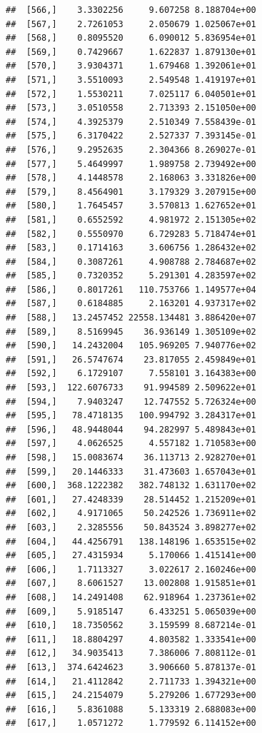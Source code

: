 \documentclass[article]{jss}\usepackage[]{graphicx}\usepackage[]{xcolor}
\makeatletter
\newenvironment{kframe}{%
 \def\at@end@of@kframe{}%
 \ifinner\ifhmode%
  \def\at@end@of@kframe{\end{minipage}}%
  \begin{minipage}{\columnwidth}%
 \fi\fi%
 \def\FrameCommand##1{\hskip\@totalleftmargin \hskip-\fboxsep
 \colorbox{shadecolor}{##1}\hskip-\fboxsep
     \hskip-\linewidth \hskip-\@totalleftmargin \hskip\columnwidth}%
 \MakeFramed {\advance\hsize-\width
   \@totalleftmargin\z@ \linewidth\hsize
   \@setminipage}}%
 {\par\unskip\endMakeFramed%
 \at@end@of@kframe}
\newenvironment{knitrout}{}{} %
\makeatother
\begin{document}
\begin{knitrout}
\begin{kframe}
\begin{verbatim}
##  [566,]    3.3302256     9.607258 8.188704e+00
##  [567,]    2.7261053     2.050679 1.025067e+01
##  [568,]    0.8095520     6.090012 5.836954e+01
##  [569,]    0.7429667     1.622837 1.879130e+01
##  [570,]    3.9304371     1.679468 1.392061e+01
##  [571,]    3.5510093     2.549548 1.419197e+01
##  [572,]    1.5530211     7.025117 6.040501e+01
##  [573,]    3.0510558     2.713393 2.151050e+00
##  [574,]    4.3925379     2.510349 7.558439e-01
##  [575,]    6.3170422     2.527337 7.393145e-01
##  [576,]    9.2952635     2.304366 8.269027e-01
##  [577,]    5.4649997     1.989758 2.739492e+00
##  [578,]    4.1448578     2.168063 3.331826e+00
##  [579,]    8.4564901     3.179329 3.207915e+00
##  [580,]    1.7645457     3.570813 1.627652e+01
##  [581,]    0.6552592     4.981972 2.151305e+02
##  [582,]    0.5550970     6.729283 5.718474e+01
##  [583,]    0.1714163     3.606756 1.286432e+02
##  [584,]    0.3087261     4.908788 2.784687e+02
##  [585,]    0.7320352     5.291301 4.283597e+02
##  [586,]    0.8017261   110.753766 1.149577e+04
##  [587,]    0.6184885     2.163201 4.937317e+02
##  [588,]   13.2457452 22558.134481 3.886420e+07
##  [589,]    8.5169945    36.936149 1.305109e+02
##  [590,]   14.2432004   105.969205 7.940776e+02
##  [591,]   26.5747674    23.817055 2.459849e+01
##  [592,]    6.1729107     7.558101 3.164383e+00
##  [593,]  122.6076733    91.994589 2.509622e+01
##  [594,]    7.9403247    12.747552 5.726324e+00
##  [595,]   78.4718135   100.994792 3.284317e+01
##  [596,]   48.9448044    94.282997 5.489843e+01
##  [597,]    4.0626525     4.557182 1.710583e+00
##  [598,]   15.0083674    36.113713 2.928270e+01
##  [599,]   20.1446333    31.473603 1.657043e+01
##  [600,]  368.1222382   382.748132 1.631170e+02
##  [601,]   27.4248339    28.514452 1.215209e+01
##  [602,]    4.9171065    50.242526 1.736911e+02
##  [603,]    2.3285556    50.843524 3.898277e+02
##  [604,]   44.4256791   138.148196 1.653515e+02
##  [605,]   27.4315934     5.170066 1.415141e+00
##  [606,]    1.7113327     3.022617 2.160246e+00
##  [607,]    8.6061527    13.002808 1.915851e+01
##  [608,]   14.2491408    62.918964 1.237361e+02
##  [609,]    5.9185147     6.433251 5.065039e+00
##  [610,]   18.7350562     3.159599 8.687214e-01
##  [611,]   18.8804297     4.803582 1.333541e+00
##  [612,]   34.9035413     7.386006 7.808112e-01
##  [613,]  374.6424623     3.906660 5.878137e-01
##  [614,]   21.4112842     2.711733 1.394321e+00
##  [615,]   24.2154079     5.279206 1.677293e+00
##  [616,]    5.8361088     5.133319 2.688083e+00
##  [617,]    1.0571272     1.779592 6.114152e+00

\end{verbatim}
\end{kframe}
\end{knitrout}
\end{document}
